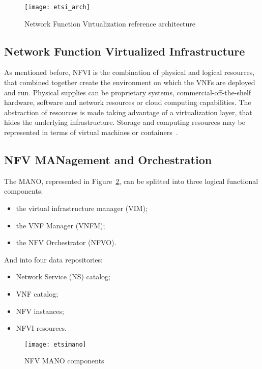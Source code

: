 \begin{figure}
  \centering
  \texttt{[image: etsi\_arch]}
  \caption[Network Function Virtualization reference architecture]{Network
    Function Virtualization reference architecture~\cite{etsi2013gs}}
  \label{chap:background:img:etsi_arch}
\end{figure}

\subsection{Network Function Virtualized Infrastructure}
As mentioned before, NFVI is the combination of physical and logical resources,
that combined together create the environment on which the VNFs are deployed
and run. Physical supplies can be proprietary systems, commercial-off-the-shelf
hardware, software and network resources or cloud computing capabilities. The
abstraction of resources is made taking advantage of a virtualization layer,
that hides the underlying infrastructure. Storage and computing resources may
be represented in terms of virtual machines or
containers~\cite{mijumbi2016network}.

\subsection{NFV MANagement and Orchestration}
The MANO, represented in Figure~\ref{chap:background:img:etsimano}, can be
splitted into three logical functional components:
\begin{itemize}
  \item the virtual infrastructure manager (VIM);
  \item the VNF Manager (VNFM);
  \item the NFV Orchestrator (NFVO).
\end{itemize}
And into four data repositories:
\begin{itemize}
  \item Network Service (NS) catalog;
  \item VNF catalog;
  \item NFV instances;
  \item NFVI resources.
\end{itemize}

\begin{figure}
  \centering
  \texttt{[image: etsimano]}
  \caption{NFV MANO components}
  \label{chap:background:img:etsimano}
\end{figure}


